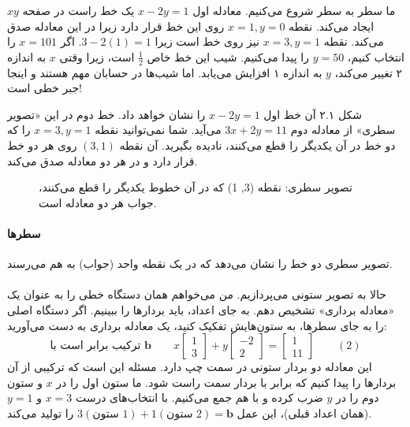 \documentclass[12pt, a4paper]{book}
\begin{document}
	ما سطر به سطر شروع می‌کنیم. معادله اول \( x - 2y = 1 \) یک خط راست در صفحه \( xy \) ایجاد می‌کند. نقطه \( x=1, y=0 \) روی این خط قرار دارد زیرا در این معادله صدق می‌کند. نقطه \( x=3, y=1 \) نیز روی خط است زیرا \( 3 - 2(1) = 1 \). اگر \( x=101 \) را انتخاب کنیم، \( y=50 \) را پیدا می‌کنیم. شیب این خط خاص \( \frac{1}{2} \) است، زیرا وقتی \( x \) به اندازه ۲ تغییر می‌کند، \( y \) به اندازه ۱ افزایش می‌یابد. اما شیب‌ها در حسابان مهم هستند و اینجا جبر خطی است!
	
	شکل ۲.۱ آن خط اول \( x - 2y = 1 \) را نشان خواهد داد. خط دوم در این «تصویر سطری» از معادله دوم \( 3x + 2y = 11 \) می‌آید. شما نمی‌توانید نقطه \( x=3, y=1 \) را که دو خط در آن یکدیگر را قطع می‌کنند، نادیده بگیرید. آن نقطه \( (3, 1) \) روی هر دو خط قرار دارد و در هر دو معادله صدق می‌کند.
	
	\begin{figure}[h!]
		\centering
		\caption{تصویر سطری: نقطه (3, 1) که در آن خطوط یکدیگر را قطع می‌کنند، جواب هر دو معادله است.}
	\end{figure}
	
	\paragraph{سطرها} تصویر سطری دو خط را نشان می‌دهد که در یک نقطه واحد (جواب) به هم می‌رسند.
	
	\paragraph{}
	حالا به تصویر ستونی می‌پردازیم. من می‌خواهم همان دستگاه خطی را به عنوان یک «معادله برداری» تشخیص دهم. به جای اعداد، باید بردارها را ببینیم. اگر دستگاه اصلی را به جای سطرها، به ستون‌هایش تفکیک کنید، یک معادله برداری به دست می‌آورید:
	\[
	\text{ترکیب برابر است با } \mathbf{b} \quad\quad x \begin{bmatrix} 1 \\ 3 \end{bmatrix} + y \begin{bmatrix} -2 \\ 2 \end{bmatrix} = \begin{bmatrix} 1 \\ 11 \end{bmatrix} \quad\quad (2)
	\]
	این معادله دو بردار ستونی در سمت چپ دارد. مسئله این است که ترکیبی از آن بردارها را پیدا کنیم که برابر با بردار سمت راست شود. ما ستون اول را در \( x \) و ستون دوم را در \( y \) ضرب کرده و با هم جمع می‌کنیم. با انتخاب‌های درست \( x=3 \) و \( y=1 \) (همان اعداد قبلی)، این عمل \( 3(\text{ستون } 1) + 1(\text{ستون } 2) = \mathbf{b} \) را تولید می‌کند.
	
\end{document}
